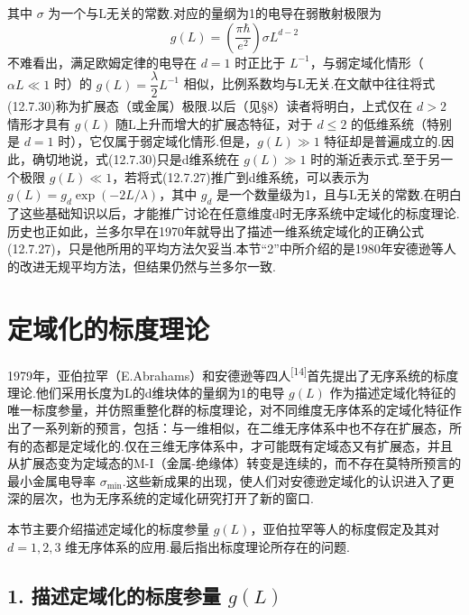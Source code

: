 其中 $\sigma$ 为一个与L无关的常数.对应的量纲为1的电导在弱散射极限为
\begin{equation}
  g\left(L\right)=\left(\frac{\pi\hbar}{e^{2}}\right)\sigma L^{d-2}
\end{equation}
不难看出，满足欧姆定律的电导在 $d=1$ 时正比于 $L^{-1}$，与弱定域化情形（$\alpha L\ll1$ 时）的 $g\left(L\right)=\dfrac{\lambda}{2}L^{-1}$ 相似，比例系数均与L无关.在文献中往往将式(12.7.30)称为扩展态（或金属）极限.以后（见§8）读者将明白，上式仅在 $d>2$ 情形才具有 $g\left(L\right)$ 随L上升而增大的扩展态特征，对于 $d\leqslant2$ 的低维系统（特别是 $d=1$ 时），它仅属于弱定域化情形.但是，$g\left(L\right)\gg1$ 特征却是普遍成立的.因此，确切地说，式(12.7.30)只是d维系统在 $g\left(L\right)\gg1$ 时的渐近表示式.至于另一个极限 $g\left(L\right)\ll1$，若将式(12.7.27)推广到d维系统，可以表示为 $g\left(L\right)=g_{d}\exp\left(-2L/\lambda\right)$，其中 $g_{d}$ 是一个数量级为1，且与L无关的常数.在明白了这些基础知识以后，才能推广讨论在任意维度d时无序系统中定域化的标度理论.历史也正如此，兰多尔早在1970年就导出了描述一维系统定域化的正确公式(12.7.27)，只是他所用的平均方法欠妥当.本节“2”中所介绍的是1980年安德逊等人的改进无规平均方法，但结果仍然与兰多尔一致.

\section{定域化的标度理论}

1979年，亚伯拉罕（E.Abrahams）和安德逊等四人\textsuperscript{[14]}首先提出了无序系统的标度理论.他们采用长度为L的d维块体的量纲为1的电导 $g\left(L\right)$ 作为描述定域化特征的唯一标度参量，并仿照重整化群的标度理论，对不同维度无序体系的定域化特征作出了一系列新的预言，包括：与一维相似，在二维无序体系中也不存在扩展态，所有的态都是定域化的.仅在三维无序体系中，才可能既有定域态又有扩展态，并且从扩展态变为定域态的M-I（金属-绝缘体）转变是连续的，而不存在莫特所预言的最小金属电导率 $\sigma_{\mathrm{min}}$.这些新成果的出现，使人们对安德逊定域化的认识进入了更深的层次，也为无序系统的定域化研究打开了新的窗口.

本节主要介绍描述定域化的标度参量 $g\left(L\right)$，亚伯拉罕等人的标度假定及其对 $d=1,2,3$ 维无序体系的应用.最后指出标度理论所存在的问题.

\subsection*{1. 描述定域化的标度参量 $g(L)$}

